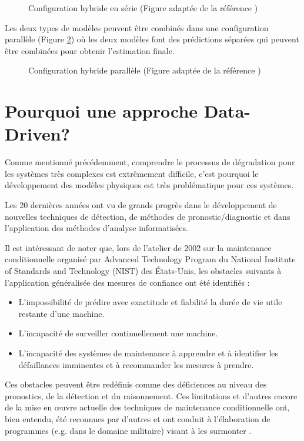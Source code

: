 \begin{figure}[H]
    \centering
    
    \caption{Configuration hybride en série (Figure adaptée de la référence \cite{Mangili2013})}
    \label{fig:hybrid-approach-series}
\end{figure}

Les deux types de modèles peuvent être combinés dans une configuration parallèle (Figure \ref{fig:hybrid-approach-parallel}) où les deux modèles font des prédictions séparées qui peuvent être combinées pour obtenir l'estimation finale.
\begin{figure}[H]
    \centering
    
    \caption{Configuration hybride parallèle (Figure adaptée de la référence \cite{Mangili2013})}
    \label{fig:hybrid-approach-parallel}
\end{figure}

\section{Pourquoi une approche Data-Driven?}
Comme mentionné précédemment, comprendre le processus de dégradation pour les systèmes très complexes est extrêmement difficile, c'est pourquoi le développement des modèles physiques est très problématique pour ces systèmes.

Les 20 dernières années ont vu de grands progrès dans le développement de nouvelles techniques de détection, de méthodes de pronostic/diagnostic et dans l’application des méthodes d’analyse informatisées. 

Il est intéressant de noter que, lors de l’atelier de 2002 sur la maintenance conditionnelle organisé par Advanced Technology Program du National Institute of Standards and Technology (NIST) des États-Unis, les obstacles suivants à l’application généralisée des mesures de confiance ont été identifiés :
\begin{itemize}%
    \item L’impossibilité de prédire avec exactitude et fiabilité la durée de vie utile restante d'une machine.
    \item L’incapacité de surveiller continuellement une machine.
    \item L’incapacité des systèmes de maintenance à apprendre et à identifier les défaillances imminentes et à recommander les mesures à prendre.
\end{itemize} 

Ces obstacles peuvent être redéfinis comme des déficiences au niveau des pronostics, de la détection et du raisonnement. Ces limitations et d'autres encore de la mise en œuvre actuelle des techniques de maintenance conditionnelle ont, bien entendu, été reconnues par d'autres et ont conduit à l'élaboration de programmes (e.g. dans le domaine militaire) visant à les surmonter \cite{Hess2008}.

